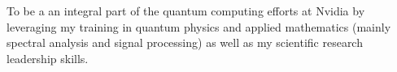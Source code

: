 To be a an integral part of the quantum computing efforts at Nvidia by leveraging my training in quantum physics and applied mathematics (mainly spectral analysis and signal processing) as well as my scientific research leadership skills. 
